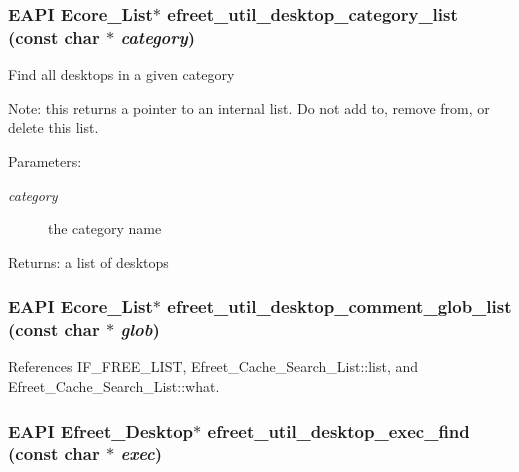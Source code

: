 \subsubsection{\setlength{\rightskip}{0pt plus 5cm}EAPI Ecore\_\-List$\ast$ efreet\_\-util\_\-desktop\_\-category\_\-list (const char $\ast$ {\em category})}\label{efreet__utils_8c_eea99e97fbede6cceccf6178fd7092e7}


Find all desktops in a given category

Note: this returns a pointer to an internal list. Do not add to, remove from, or delete this list.

\begin{Desc}
\item[Parameters:]
\begin{description}
\item[{\em category}]the category name \end{description}
\end{Desc}
\begin{Desc}
\item[Returns:]a list of desktops \end{Desc}
\subsubsection{\setlength{\rightskip}{0pt plus 5cm}EAPI Ecore\_\-List$\ast$ efreet\_\-util\_\-desktop\_\-comment\_\-glob\_\-list (const char $\ast$ {\em glob})}\label{efreet__utils_8c_e17d6c23f6e683fd97a60956f0724539}




References IF\_\-FREE\_\-LIST, Efreet\_\-Cache\_\-Search\_\-List::list, and Efreet\_\-Cache\_\-Search\_\-List::what.
\subsubsection{\setlength{\rightskip}{0pt plus 5cm}EAPI {\bf Efreet\_\-Desktop}$\ast$ efreet\_\-util\_\-desktop\_\-exec\_\-find (const char $\ast$ {\em exec})}\label{efreet__utils_8c_57cc0bf2b575e2e61d6a6964497b7cd7}




